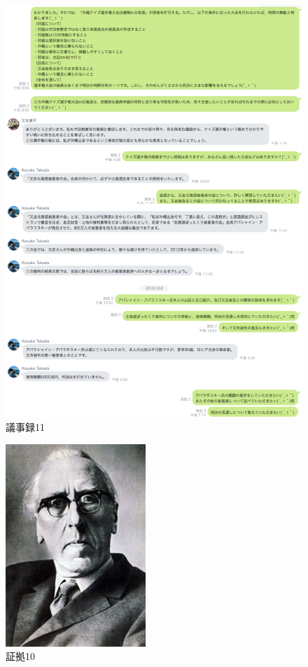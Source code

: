\begin{figure}[H]
  \centering
  \includegraphics[clip,scale=0.5]{./section/Taira/figures/giji102}
  \caption{議事録11}
\label{giji102}
\end{figure}

\begin{figure}[H]
  \centering
  \includegraphics[clip,scale=0.7]{./section/Taira/figures/fig10}
  \caption{証拠10}
\label{fig10}
\end{figure}


